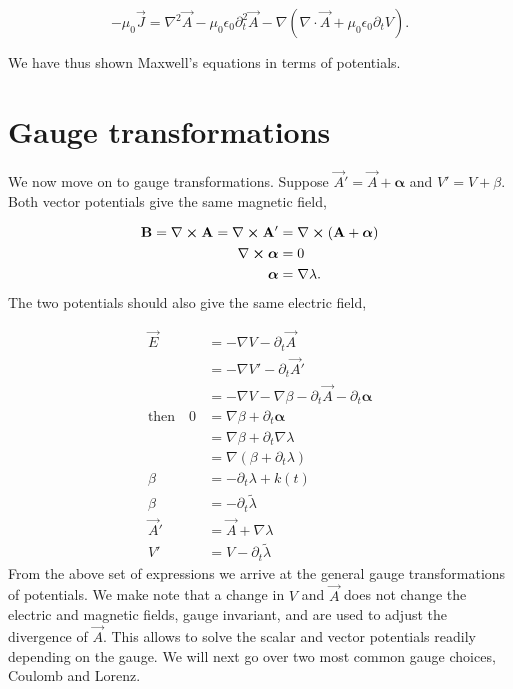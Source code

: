 \begin{equation}
  -\mu_0 \vec{J} = \nabla^2 \vec{A} - \mu_0 \epsilon_0 \partial_t^2 \vec{A} - \nabla \left( \nabla \cdot \vec{A} + \mu_0 \epsilon_0 \partial_t V \right).
  \label{eq:current-as-potential}
\end{equation}

We have thus shown Maxwell's equations in terms of potentials.

\section{Gauge transformations}
We now move on to gauge transformations.
Suppose $\vec{A}' = \vec{A}+\bm{\alpha}$ and $V' = V+\beta$.
Both vector potentials give the same magnetic field,

\begin{align}
  \mathbf{B} = \nabla \cross \mathbf{A} = \nabla \cross \mathbf{A}' &= \nabla \cross (\mathbf{A} + \bm{\alpha}) \\
  \nabla \cross \bm{\alpha} &= 0 \\
  \bm{\alpha} &= \nabla \lambda.
\end{align}
The two potentials should also give the same electric field,

\begin{align}
  \vec{E} &= -\nabla V - \partial_t \vec{A} \\
  &= -\nabla V' - \partial_t \vec{A}' \nonumber \\
  &= -\nabla V - \nabla \beta - \partial_t \vec{A} - \partial_t \bm{\alpha} \nonumber \\
  \text{then} \quad 0 &= \nabla \beta + \partial_t \bm{\alpha}\\
  &= \nabla \beta + \partial_t \nabla\lambda \nonumber \\
  &= \nabla ( \beta + \partial_t \lambda ) \nonumber \\
  \beta &= -\partial_t \lambda + k(t) \nonumber \\
  \beta &= -\partial_t \tilde{\lambda} \nonumber \\
  \vec{A}' &= \vec{A} + \nabla \lambda \\
  V' &= V - \partial_t \tilde{\lambda}
\end{align}
From the above set of expressions we arrive at the general gauge transformations of potentials.
We make note that a change in $V$ and $\vec{A}$ does not change the electric and magnetic fields, gauge invariant, and are used to adjust the divergence of $\vec{A}$.
This allows to solve the scalar and vector potentials readily depending on the gauge.
We will next go over two most common gauge choices, Coulomb and Lorenz.

